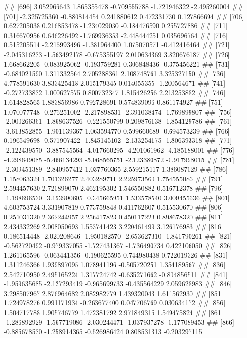 \documentclass[
]{article}
\begin{document}
\begin{enumerate}[label=(\alph*)]
##  [696]  3.052966643  1.865355478 -0.709555788 -1.721946322 -2.495260004
##  [701] -2.325725360 -0.880814454  0.241880612  0.472331730  0.127866694
##  [706]  0.627205038  0.216853478 -1.234029030 -0.184476590  0.255727886
##  [711]  0.316670956  0.646226492 -1.769936353 -2.448444251  0.035696764
##  [716]  0.515205514 -2.216993496 -1.381964400  1.075070571 -0.412416464
##  [721] -2.045316233 -1.563492178 -0.675355197  2.010634369  3.820676187
##  [726]  1.668662205 -0.083925062 -0.193759281  0.306848436 -0.375456221
##  [731] -0.684021590  1.311332564  2.705288361  2.108748761  3.325327150
##  [736]  4.778591630  3.833425418  2.015179345  0.014055355 -1.200564671
##  [741] -0.272733832  1.000627575  0.800732347  1.815426256  2.213253882
##  [746]  1.614828565  1.883856986  0.792728691  0.574839096  0.861174927
##  [751]  1.070077748 -0.276251002 -2.217898531 -2.391038474 -1.769899807
##  [756] -2.000266361 -1.868637526 -0.221550799  0.209876138 -1.854129786
##  [761] -3.613852855 -1.901139367  1.063594770  0.599660689 -0.694573239
##  [766]  0.196549698 -0.571907422 -1.845145102 -2.133254175 -1.806393318
##  [771] -2.122439570 -3.887545564 -4.017660295 -4.201061962 -4.185188001
##  [776] -4.298649085 -5.466134293 -5.068565751 -2.123380872 -0.917998015
##  [781] -2.309451389 -2.840957412  1.037760365  2.559215117  1.386087029
##  [786]  1.158063324  1.701326277  2.403289711  2.225973560  1.754555086
##  [791]  2.594457630  2.720899070  2.462195302  1.546550882  0.516712378
##  [796] -1.198696530 -3.153990605 -0.345665951  1.533578540  3.009455636
##  [801]  4.603753724  3.331907819  0.773759848  0.411762607  0.515530670
##  [806]  0.251031320  2.362244957  2.256417823  0.450117223  0.898678320
##  [811]  2.434332269  2.008050693  1.553741423  3.220461499  3.126176983
##  [816]  0.186514448 -2.020208646 -1.950182570 -2.653627310 -1.841790261
##  [821] -0.562720492 -0.979337055 -1.727431367 -1.736490734  0.422106050
##  [826]  1.261165596 -0.063441356 -0.190625595  0.744980438  0.722019326
##  [831]  1.311246366  1.939897095  1.078941196 -0.505720251  1.354189567
##  [836]  2.542710950  2.495165224  1.317724742 -0.635271662 -0.804856511
##  [841] -1.959635685 -2.127293419 -0.965699733 -0.435564229  2.059628983
##  [846]  3.298507967  2.876964682  2.082982779  1.439320043  1.611562930
##  [851]  1.724978276  0.991171934 -0.263677400  0.047706769  0.030634172
##  [856]  1.504717788  1.905746779  1.472381792  2.971849315  1.549475824
##  [861] -1.286892929 -1.567719086 -2.030244471 -1.037937278 -0.177089453
##  [866] -0.885678530 -1.258914365 -0.526986424  0.808531313 -0.203297115

\end{enumerate}
\end{document}
